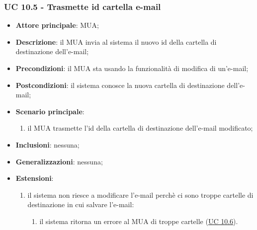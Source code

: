     \subsubsection{UC 10.5 - Trasmette id cartella e-mail} \label{sec:UC10.5}
    \begin{itemize}
        \item \textbf{Attore principale}: MUA;
        \item \textbf{Descrizione}: il MUA invia al sistema il nuovo id della cartella di destinazione dell'e-mail;
        \item \textbf{Precondizioni}: il MUA sta usando la funzionalità di modifica di un'e-mail;
        \item \textbf{Postcondizioni}: il sistema conosce la nuova cartella di destinazione dell'e-mail;
        \item \textbf{Scenario principale}:
            \begin{enumerate}
                \item il MUA trasmette l'id della cartella di destinazione dell'e-mail modificato;
            \end{enumerate}
        \item \textbf{Inclusioni}: nessuna;
        \item \textbf{Generalizzazioni}: nessuna;
        \item \textbf{Estensioni}:             
        \begin{enumerate}[label=\alph*.]
            \item il sistema non riesce a modificare l'e-mail perchè ci sono troppe cartelle di destinazione in cui salvare l'e-mail:
            \begin{enumerate}[label=\arabic*.]
                \item il sistema ritorna un errore al MUA di troppe cartelle (\hyperref[sec:UC10.6]{UC 10.6}).
            \end{enumerate}
        \end{enumerate}
    \end{itemize}

